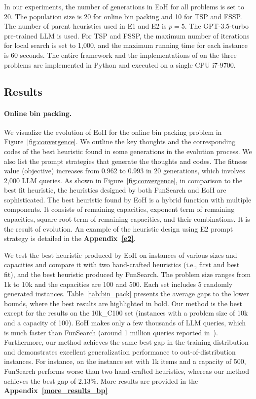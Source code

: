 In our experiments, the number of generations in EoH for all problems is set to 20. The population size is 20 for online bin packing and 10 for TSP and FSSP. The number of parent heuristics used in E1 and E2 is $p=5$. The GPT-3.5-turbo pre-trained LLM is used. For TSP and FSSP, the maximum number of iterations for local search is set to 1,000, and the maximum running time for each instance is 60 seconds. The entire framework and the implementations of \ourmethod{} on the three problems are implemented in Python and executed on a single CPU i7-9700.

\subsection{Results}


\paragraph{Online bin packing.} 

We visualize the evolution of EoH for the online bin packing problem in Figure~\ref{fig:convergence}. We outline the key thoughts and the corresponding codes of the best heuristic found in some generations in the evolution process. We also list the prompt strategies that generate the thoughts and codes. The fitness value (objective) increases from 0.962 to 0.993 in 20 generations, which involves 2,000 LLM queries. 
As shown in Figure~\ref{fig:convergence}, in comparison to the best fit heuristic, the heuristics designed by both FunSearch and EoH are sophisticated.  The best heuristic found by EoH is a hybrid function with multiple components. It consists of remaining capacities, exponent term of remaining capacities, square root term of remaining capacities, and their combinations. It is the result of evolution. An example of the heuristic design using E2 prompt strategy is detailed in the \textbf{Appendix~\ref{e2}}. 

We test the best heuristic produced by EoH on instances of various sizes and capacities and compare it with two hand-crafted heuristics (i.e., first and best fit), and the best heuristic produced by FunSearch. The problem size ranges from 1k to 10k and the capacities are 100 and 500. Each set includes 5 randomly generated instances.
Table~\ref{tab:bin_pack} presents the average gaps to the lower bounds, where the best results are highlighted in bold. Our method is the best except for the results on the 10k\_C100 set (instances with a problem size of 10k and a capacity of 100). EoH makes only a few thousands of LLM queries, which is much faster than FunSearch (around 1 million queries reported in~\citet{romera2024mathematical}). Furthermore, our method achieves the same best gap in the training distribution and demonstrates excellent generalization performance to out-of-distribution instances. For instance, on the instance set with 1k items and a capacity of 500, FunSearch performs worse than two hand-crafted heuristics, whereas our method achieves the best gap of 2.13\%. More results are provided in the \textbf{Appendix~\ref{more_results_bp}}





